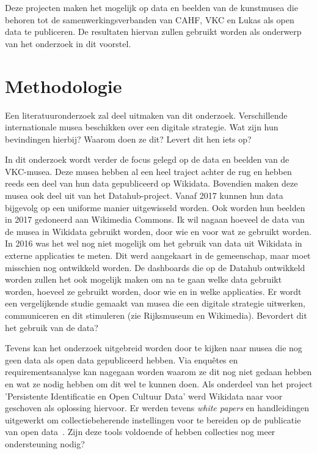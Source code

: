 \documentclass[fleqn,10pt]{voorstel}
\begin{document}
Deze projecten maken het mogelijk op data en beelden van de kunstmusea die behoren tot de samenwerkingsverbanden van CAHF, VKC en Lukas als open data te publiceren. De resultaten hiervan zullen gebruikt worden als onderwerp van het onderzoek in dit voorstel.





\section{Methodologie}
\label{sec:methodologie}

Een literatuuronderzoek zal deel uitmaken van dit onderzoek. Verschillende internationale musea beschikken over een digitale strategie. Wat zijn hun bevindingen hierbij? Waarom doen ze dit? Levert dit hen iets op? 

In dit onderzoek wordt verder de focus gelegd op de data en beelden van de VKC-musea. Deze musea hebben al een heel traject achter de rug en hebben reeds een deel van hun data gepubliceerd op Wikidata. Bovendien maken deze musea ook deel uit van het Datahub-project. Vanaf 2017 kunnen hun data bijgevolg op een uniforme manier uitgewisseld worden. Ook worden hun beelden in 2017 gedoneerd aan Wikimedia Commons. Ik wil nagaan hoeveel de data van de musea in Wikidata gebruikt worden, door wie en voor wat ze gebruikt worden. In 2016 was het wel nog niet mogelijk om het gebruik van data uit Wikidata in externe applicaties te meten. Dit werd aangekaart in de gemeenschap, maar moet misschien nog ontwikkeld worden. De dashboards die op de Datahub ontwikkeld worden zullen het ook mogelijk maken om na te gaan welke data gebruikt worden, hoeveel ze gebruikt worden, door wie en in welke applicaties. Er wordt een vergelijkende studie gemaakt van musea die een digitale strategie uitwerken, communiceren en dit stimuleren (zie Rijksmuseum en Wikimedia). Bevordert dit het gebruik van de data?

Tevens kan het onderzoek uitgebreid worden door te kijken naar musea die nog geen data als open data gepubliceerd hebben. Via enquêtes en requirementsanalyse kan nagegaan worden waarom ze dit nog niet gedaan hebben en wat ze nodig hebben om dit wel te kunnen doen. Als onderdeel van het project 'Persistente Identificatie en Open Cultuur Data' werd Wikidata naar voor geschoven als oplossing hiervoor. Er werden tevens \emph{white papers} en handleidingen uitgewerkt om collectiebeherende instellingen voor te bereiden op de publicatie van open data~\autocite{Saenko2016}. Zijn deze tools voldoende of hebben collecties nog meer ondersteuning nodig?
\end{document}
